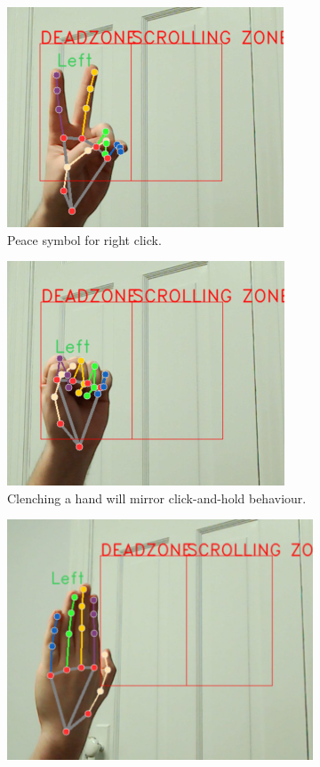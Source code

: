 \documentclass{article}
\begin{document}
\begin{figure}
\begin{subfigure}[T]{0.3\textwidth}
        \includegraphics[width=.8\linewidth]{peace.png}
        \caption{Peace symbol for right click.}
    \end{subfigure}\hfill
    \begin{subfigure}[T]{0.3\textwidth}
        \centering
        \includegraphics[width=.8\linewidth]{fist.png}
        \caption{Clenching a hand will mirror click-and-hold behaviour.}
    \end{subfigure}
    \begin{subfigure}[T]{0.3\textwidth}
        \centering
        \includegraphics[width=.8\linewidth]{stop_inverted.png}

\end{subfigure}
\end{figure}
\end{document}
